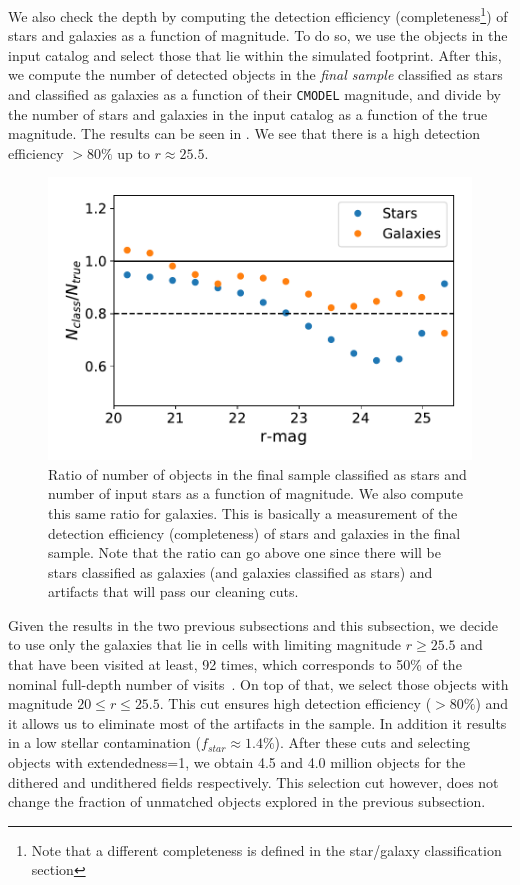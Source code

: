 \documentclass[\docopts]{\docclass}
\begin{document}
We also check the depth by computing the detection efficiency (completeness\footnote{Note that a different completeness is defined in the star/galaxy classification section}) of stars and galaxies as a function of magnitude. To do so, we use the objects in the input catalog and select those that lie within the simulated footprint. After this, we compute the number of detected objects in the \textit{final sample} classified as stars and classified as galaxies as a function of their \texttt{CMODEL} magnitude, and divide by the number of stars and galaxies in the input catalog as a function of the true magnitude. The results can be seen in . We see that there is a high detection efficiency $> 80\%$ up to $r \approx 25.5$.  

\begin{figure}
\centering
\includegraphics[width=0.9\columnwidth]{stellar_detection_efficiency.pdf}
\caption{Ratio of number of objects in the final sample classified as stars and number of input stars as a function of magnitude. We also compute this same ratio for galaxies. This is basically a measurement of the detection efficiency (completeness) of stars and galaxies in the final sample. Note that the ratio can go above one since there will be stars classified as galaxies (and galaxies classified as stars) and artifacts that will pass our cleaning cuts.}
\label{fig:stellar_detection_efficiency}
\end{figure}

Given the results in the two previous subsections and this subsection, we decide to use only the galaxies that lie in cells with limiting magnitude $r \geq 25.5$ and that have been visited at least, 92 times, which corresponds to 50\% of the nominal full-depth number of visits~\citep{Overview}. On top of that, we select those objects with magnitude $20 \leq r \leq 25.5$. This cut ensures high detection efficiency ($>80\%$) and it allows us to eliminate most of the artifacts in the sample. In addition it results in a low stellar contamination ($f_{star} \approx 1.4\%$). After these cuts and selecting objects with extendedness=1, we obtain 4.5 and 4.0 million objects for the dithered and undithered fields respectively. This selection cut however, does not change the fraction of unmatched objects explored in the previous subsection.
\end{document}

